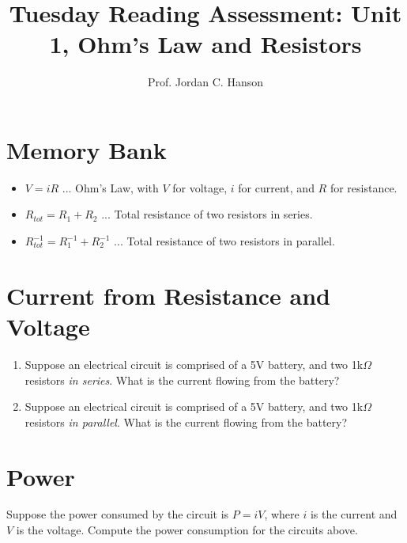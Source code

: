 \documentclass{article}
\begin{document}
\title{Tuesday Reading Assessment: Unit 1, Ohm's Law and Resistors}
\author{Prof. Jordan C. Hanson}

\maketitle

\section{Memory Bank}

\begin{itemize}
\item $V = i R$ ... Ohm's Law, with $V$ for voltage, $i$ for current, and $R$ for resistance.
\item $R_{tot} = R_1 + R_2$ ... Total resistance of two resistors in series.
\item $R_{tot}^{-1} = R_1^{-1} + R_2^{-1}$ ... Total resistance of two resistors in parallel.
\end{itemize}

\section{Current from Resistance and Voltage}

\begin{enumerate}
\item Suppose an electrical circuit is comprised of a 5V battery, and two 1k$\Omega$ resistors \textit{in series}.  What is the current flowing from the battery? \\ \vspace{3cm}
\item Suppose an electrical circuit is comprised of a 5V battery, and two 1k$\Omega$ resistors \textit{in parallel}.  What is the current flowing from the battery? \\ \vspace{3cm}
\end{enumerate}

\section{Power}

Suppose the power consumed by the circuit is $P = i V$, where $i$ is the current and $V$ is the voltage.  Compute the power consumption for the circuits above.
\end{document}
